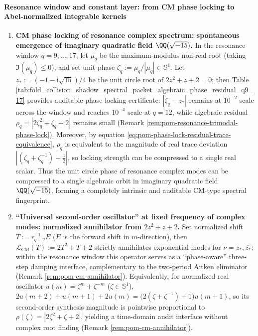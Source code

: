 \paragraph{Resonance window and constant layer: from CM phase locking to Abel-normalized integrable kernels}
\begin{enumerate}
  \item \textbf{CM phase locking of resonance complex spectrum: spontaneous emergence of imaginary quadratic field \texorpdfstring{$\QQ(\sqrt{-15})$}{Q(sqrt(-15))}.}
  In the resonance window \(q=9,\dots,17\), let \(\mu_q\) be the maximum-modulus non-real root (taking \(\Im(\mu_q)\le 0\)), and set unit phase
  \(\zeta_q:=\mu_q/|\mu_q|\in\mathbb{S}^1\).
  Let
  \(
  z_\ast:=(-1-\mathrm{i}\sqrt{15})/4
  \)
  be the unit circle root of \(2z^2+z+2=0\); then Table \ref{tab:fold_collision_shadow_spectral_packet_algebraic_phase_residual_q9_17} provides auditable phase-locking certificate: \(|\zeta_q-z_\ast|\) remains at \(10^{-2}\) scale across the window and reaches \(10^{-4}\) scale at \(q=12\), while algebraic residual \(\rho_q=|2\zeta_q^2+\zeta_q+2|\) remains small (Remark \ref{rem:pom-resonance-trimodal-phase-lock}).
  Moreover, by equation \eqref{eq:pom-phase-lock-residual-trace-equivalence}, \(\rho_q\) is equivalent to the magnitude of real trace deviation \(|(\zeta_q+\zeta_q^{-1})+\tfrac12|\), so locking strength can be compressed to a single real scalar.
  Thus the unit circle phase of resonance complex modes can be compressed to a single algebraic orbit in imaginary quadratic field \(\QQ(\sqrt{-15})\), forming a completely intrinsic and auditable CM-type spectral fingerprint.

  \item \textbf{``Universal second-order oscillator'' at fixed frequency of complex modes: normalized annihilator from \texorpdfstring{$2z^2+z+2$}{2z^2+z+2}.}
  Set normalized shift \(T:=r_{q-2}^{-1}E\) (\(E\) is the forward shift in \(m\)-direction), then \(\mathcal L_{\mathrm{CM}}(T):=2T^2+T+2\) strictly annihilates exponential modes for \(\nu=z_\ast,\overline{z_\ast}\); within the resonance window this operator serves as a ``phase-aware'' three-step damping interface, complementary to the two-period Aitken eliminator (Remark \ref{rem:pom-cm-annihilator}).
  Equivalently, for normalized real oscillator \(u(m)=\zeta^{m}+\zeta^{-m}\) (\(\zeta\in\mathbb{S}^1\)),
  \(2u(m+2)+u(m+1)+2u(m)=\bigl(2(\zeta+\zeta^{-1})+1\bigr)u(m+1)\),
  so its second-order synthesis magnitude is pointwise proportional to \(\rho(\zeta)=|2\zeta^2+\zeta+2|\), yielding a time-domain audit interface without complex root finding (Remark \ref{rem:pom-cm-annihilator}).


\end{enumerate}
